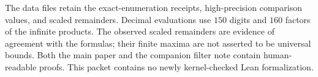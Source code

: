 The data files retain the exact-enumeration receipts, high-precision comparison values, and
scaled remainders. Decimal evaluations use $150$ digits and $160$ factors of the infinite products.
The observed scaled remainders are evidence of agreement with the formulas; their finite maxima
are not asserted to be universal bounds. Both the main paper and the companion filter note
contain human-readable proofs. This packet contains no newly kernel-checked Lean formalization.
